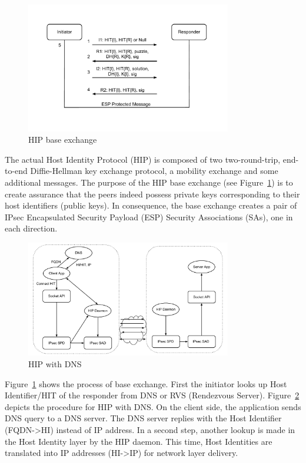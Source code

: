 \begin{figure}[htb!]
\centering
\includegraphics[width=0.8\textwidth]{images/HIP_figure2}
\caption{HIP base exchange}
\label{fig:HIP_be}
\end{figure}

The actual Host Identity Protocol (HIP) is composed of two two-round-trip, end-to-end Diffie-Hellman key exchange protocol, a mobility exchange and some additional messages. The purpose of the HIP base exchange (see Figure~\ref{fig:HIP_be}) is to create assurance that the peers indeed possess private keys corresponding to their host identifiers (public keys). In consequence, the base exchange creates a pair of IPsec Encapsulated Security Payload (ESP) Security Associations (SAs), one in each direction.

\begin{figure}[htb!]
\centering
\includegraphics[width=0.8\textwidth]{images/HIP_figure3}
\caption{HIP with DNS}
\label{fig:HIP_DNS}
\end{figure}

Figure~\ref{fig:HIP_be} shows the process of base exchange. First the initiator looks up Host Identifier/HIT of the responder from DNS or RVS (Rendezvous Server). Figure~\ref{fig:HIP_DNS} depicts the procedure for HIP with DNS. On the client side, the application sends DNS query to a DNS server. The DNS server replies with the Host Identifier (FQDN-\textgreater HI) instead of IP address. In a second step, another lookup is made in the Host Identity layer by the HIP daemon. This time, Host Identities are translated into IP addresses (HI-\textgreater IP) for network layer delivery.

